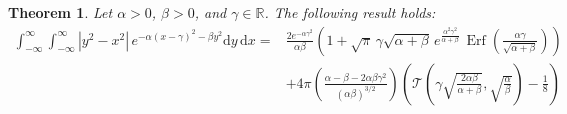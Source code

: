 \documentclass[journal]{IEEEtran}
\theoremstyle{plain}
\newtheorem{theorem}{Theorem}[section]
\theoremstyle{definition}
\theoremstyle{remark}
\newcommand{\R}{\mathbb{R}}
\newcommand{\Ot}{\mathcal{T}}
\newcommand{\Erf}{\operatorname{Erf}}
\newcommand{\dd}{\mathrm{d}}
\begin{document}
\begin{theorem} \label{thrm:integral_crossing}
Let $\alpha > 0$, $\beta > 0$, and $\gamma \in \R$. The following result holds:
\begin{equation}
\begin{split}
 \int_{-\infty}^\infty \int_{-\infty}^\infty \left|y^2-x^2\right| \, e^{-\alpha(x-\gamma)^2-\beta y^2} \dd y \, \dd x =& \frac{2e^{-\alpha \gamma^2}}{\alpha\beta} \left(1 + \sqrt{\pi} \, \gamma \sqrt{\alpha + \beta}  \, e^{\frac{\alpha^2 \gamma^2}{\alpha + \beta}}  \, \Erf\left(\frac{\alpha \gamma}{\sqrt{\alpha + \beta}}\right)\right) \\& + 4 \pi \left(\frac{\alpha - \beta - 2\alpha \beta \gamma^2}{\left(\alpha\beta\right)^{3/2}}\right) \left(\Ot\left(\gamma\sqrt{\frac{2\alpha\beta}{\alpha+\beta}}, \sqrt{\frac{\alpha}{\beta}}\right)-\frac{1}{8}\right)
\end{split} \label{eq:crossing_theorem_equation}
\end{equation}
\end{theorem}
\end{document}
